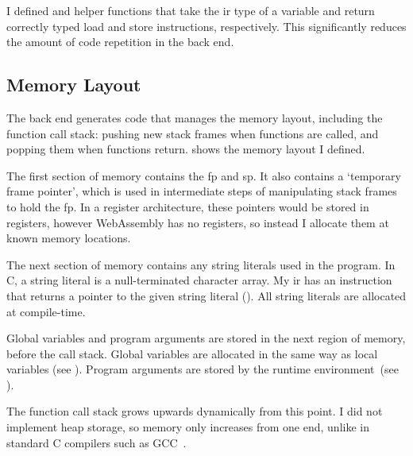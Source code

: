 \documentclass[00-main.tex]{subfiles}
\begin{document}
I defined  and  helper functions that take the \gls{ir} type of a variable and return correctly typed load and store instructions, respectively.
This significantly reduces the amount of code repetition in the back end.


\vspace{-6pt}
\subsection{Memory Layout}

The back end generates code that manages the memory layout, including the function call stack: pushing new stack frames when functions are called, and popping them when functions return.
 shows the memory layout I defined.


The first section of memory contains the \gls{fp} and \gls{sp}.
It also contains a `temporary frame pointer', which is used in intermediate steps of manipulating stack frames to hold the \gls{fp}.
In a register architecture, these pointers would be stored in registers, however WebAssembly has no registers, so instead I allocate them at known memory locations.

The next section of memory contains any string literals used in the program.
In C, a string literal is a null-terminated character array.
My \gls{ir} has an instruction that returns a pointer to the given string literal ().
All string literals are allocated at compile-time.

Global variables and program arguments are stored in the next region of memory, before the call stack.
Global variables are allocated in the same way as local variables (see ).
Program arguments are stored by the runtime environment~(see ).

The function call stack grows upwards dynamically from this point.
I did not implement heap storage, so memory only increases from one end, unlike in standard C compilers such as GCC~.
\end{document}
